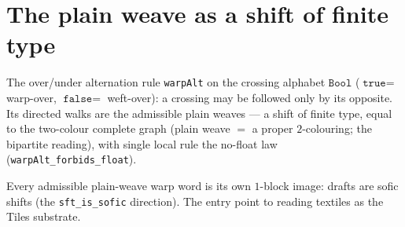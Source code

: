 \section{The plain weave as a shift of finite type}

\begin{proposition}\label{thm:weave-draft}\leanok{}
The over/under alternation rule \texttt{warpAlt} on the crossing alphabet $\texttt{Bool}$
($\texttt{true}=$ warp-over, $\texttt{false}=$ weft-over): a crossing may be followed only
by its opposite. Its directed walks are the admissible plain weaves --- a shift of finite
type, equal to the two-colour complete graph (plain weave $=$ a proper $2$-colouring; the
bipartite reading), with single local rule the no-float law (\texttt{warpAlt\_forbids\_float}).
\end{proposition}

\begin{theorem}\label{thm:weave-draft-sofic}\leanok{}
Every admissible plain-weave warp word is its own $1$-block image: drafts are sofic shifts
(the \texttt{sft\_is\_sofic} direction). The entry point to reading textiles as the
Tiles substrate.
\end{theorem}
